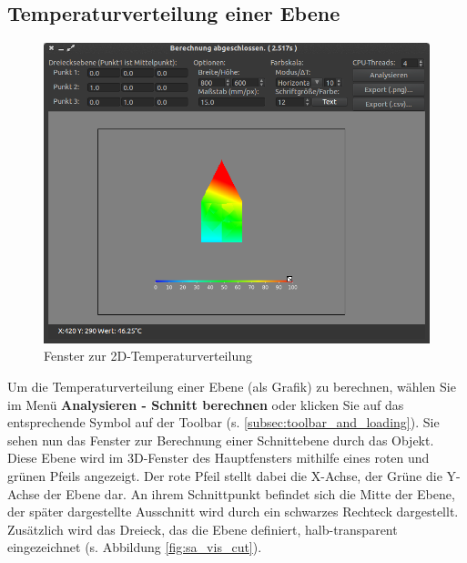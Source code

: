 \documentclass[10pt,a5paper,twoside,titlepage]{scrartcl}
\begin{document}
	\subsection{Temperaturverteilung einer Ebene}
	\label{subsec:render_cut}
	\begin{figure}
	\centering
	\includegraphics[trim=0cm 0cm 0cm 0cm,clip=true,scale=.3
	]{SA_render_cut.png}
	\caption{Fenster zur 2D-Temperaturverteilung}
	\label{fig:sa_render_cut}
	\end{figure}	
	Um die Temperaturverteilung einer Ebene (als Grafik) zu berechnen, wählen Sie im Menü \textbf{Analysieren - Schnitt berechnen} oder klicken Sie auf das entsprechende Symbol auf der Toolbar (s. \ref{subsec:toolbar_and_loading}). Sie sehen nun das Fenster zur Berechnung einer Schnittebene durch das Objekt. Diese Ebene wird im 3D-Fenster des Hauptfensters mithilfe eines roten und grünen Pfeils angezeigt. Der rote Pfeil stellt dabei die X-Achse, der Grüne die Y-Achse der Ebene dar. An ihrem Schnittpunkt befindet sich die Mitte der Ebene, der später dargestellte Ausschnitt wird durch ein schwarzes Rechteck dargestellt. Zusätzlich wird das Dreieck, das die Ebene definiert, halb-transparent eingezeichnet (s. Abbildung \ref{fig:sa_vis_cut}).
\end{document}
